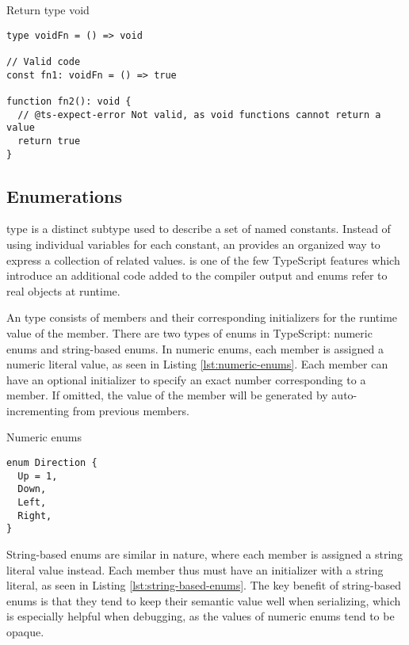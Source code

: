 \begin{listing}[h]
  \caption{Return type void}\label{lst:void-return-type}
  \begin{verbatim}
type voidFn = () => void

// Valid code
const fn1: voidFn = () => true

function fn2(): void {
  // @ts-expect-error Not valid, as void functions cannot return a value
  return true
}
\end{verbatim}
\end{listing}

\subsection{Enumerations}

 type is a distinct subtype used to describe a set of named constants. Instead of using individual variables for each constant, an  provides an organized way to express a collection of related values.  is one of the few TypeScript features which introduce an additional code added to the compiler output and enums refer to real objects at runtime.

An  type consists of members and their corresponding initializers for the runtime value of the member. There are two types of enums in TypeScript: numeric enums and string-based enums. In numeric enums, each member is assigned a numeric literal value, as seen in Listing \ref{lst:numeric-enums}. Each member can have an optional initializer to specify an exact number corresponding to a member. If omitted, the value of the member will be generated by auto-incrementing from previous members.

\begin{listing}[h]
  \caption{Numeric enums}\label{lst:numeric-enums}
  \begin{verbatim}
enum Direction {
  Up = 1,
  Down,
  Left,
  Right,
}
\end{verbatim}
\end{listing}

String-based enums are similar in nature, where each member is assigned a string literal value instead. Each member thus must have an initializer with a string literal, as seen in Listing \ref{lst:string-based-enums}. The key benefit of string-based enums is that they tend to keep their semantic value well when serializing, which is especially helpful when debugging, as the values of numeric enums tend to be opaque.


